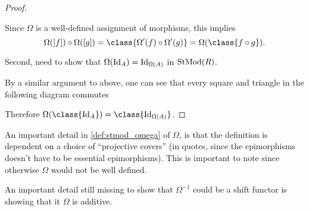 \begin{proof}
\begin{center}
    \end{center}
    Since \( \Omega \) is a well-defined assignment of morphisms, this implies
    \[
        \Omega([f]) \circ \Omega([g]) = \class{\Omega'(f) \circ \Omega'(g)} = \Omega(\class{f \circ g}).
    \]

    Second, need to show that \( \Omega(\operatorname{Id}_A) = \operatorname{Id}_{\Omega(A)} \) in \( \operatorname{StMod}(R) \).

    By a similar argument to above, one can see that every square and triangle in the following diagram commutes
    \begin{center}
    \end{center}
    Therefore \( \Omega(\class{\Id_A}) = \class{\Id_{\Omega(A)}} \).
\end{proof}

An important detail in \autoref{def:stmod_omega} of \( \Omega \), is that the definition is dependent on a choice of ``projective covers'' (in quotes, since the epimorphisms doesn't have to be essential epimorphisms). This is important to note since otherwise \( \Omega \) would not be well defined.

An important detail still missing to show that \( \Omega^{-1} \) could be a shift functor is showing that it \( \Omega \) is additive.

